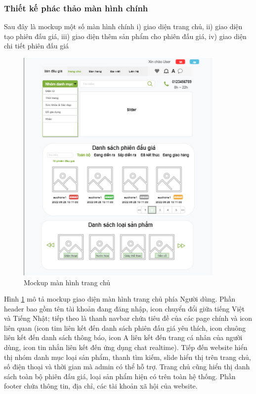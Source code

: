 \documentclass[../DoAn.tex]{subfiles}
\begin{document}
\subsubsection{Thiết kế phác thảo màn hình chính}
Sau đây là mockup một số màn hình chính i) giao diện trang chủ, ii) giao diện tạo phiên đấu giá, iii) giao diện thêm sản phẩm cho phiên đấu giá, iv) giao diện chi tiết phiên đấu giá
\begin{figure}[H]
    \centering
    \includegraphics[width=10.1cm,height=11.64cm]{Hinhve/homepage.png}
    \caption{Mockup màn hình trang chủ}
    \label{fig:Fig48}
\end{figure}
Hình \ref{fig:Fig48} mô tả mockup giao diện màn hình trang chủ phía Người dùng. Phần header bao gồm tên tài khoản đang đăng nhập, icon chuyển đổi giữa tiếng Việt và Tiếng Nhật; tiếp theo là thanh navbar chứa tiêu đề của các page chính và icon liên quan (icon tim liên kết đến danh sách phiên đấu giá yêu thích, icon chuông liên kết đến danh sách thông báo, icon A liên kết đến trang cá nhân của người dùng, icon tin nhắn liên kết đến ứng dụng chat realtime). Tiếp đến website hiển thị nhóm danh mục loại sản phẩm, thanh tìm kiếm, slide hiển thị trên trang chủ, số điện thoại và thời gian mà admin có thể hỗ trợ. Trang chủ cũng hiển thị danh sách toàn bộ phiên đấu giá, loại sản phẩm hiện có trên toàn hệ thống. Phần footer chứa thông tin, địa chỉ, các tài khoản xã hội của website.
\end{document}

